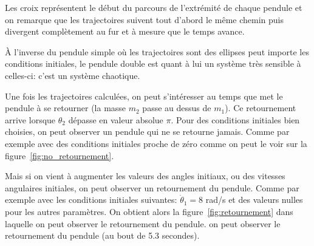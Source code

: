 Les croix représentent le début du parcours de l'extrémité de chaque pendule et on remarque que les trajectoires suivent tout d'abord le même chemin puis divergent complètement au fur et à mesure que le temps avance.

À l'inverse du pendule simple où les trajectoires sont des ellipses peut importe les conditions initiales, 
le pendule double est quant à lui un système très sensible à celles-ci: c'est un système chaotique.  

\bigskip

Une fois les trajectoires calculées, on peut s'intéresser au temps que met le pendule à se retourner (la masse $ m_{2} $ passe au
dessus de $ m_{1} $).
Ce retournement arrive lorsque $ \theta_{2} $ dépasse en valeur absolue $ \pi $.
Pour des conditions initiales bien choisies, on peut observer un pendule qui ne se retourne jamais. Comme par 
exemple avec des conditions initiales proche de zéro comme on peut le voir sur la figure~\ref{fig:no_retournement}. 

Mais si on vient à augmenter les valeurs des angles initiaux, ou 
des vitesses angulaires initiales, on peut observer un retournement du pendule. Comme par exemple avec les conditions initiales suivantes:
$ \dot \theta_{1} = 8 $ rad/s et des valeurs nulles pour les autres paramètres. On obtient alors la figure~\ref{fig:retournement} dans laquelle on peut observer le retournement du pendule.
on peut observer le retournement du pendule (au bout de 5.3 secondes).

